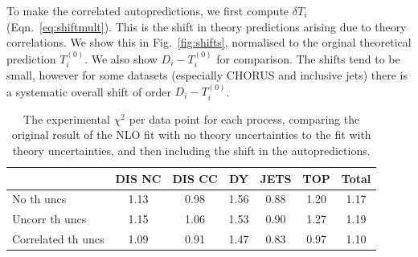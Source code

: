 To make the correlated autopredictions, we first compute $\delta T_i$ (Eqn.~\ref{eq:shiftmult}). This is the shift in theory predictions arising due to theory correlations. We show this in Fig.~\ref{fig:shifts}, normalised to the orginal theoretical prediction $T^{(0)}_i$. We also show $D_i-T_i^{(0)}$ for comparison. The shifts tend to be small, however for some datasets (especially CHORUS and inclusive jets) there is a systematic overall shift of order $D_i-T_i^{(0)}$.

\begin{table}[b!]
\centering
\begin{tabular}{|l||ccccc|c|}
\hline
                   & \textbf{DIS NC} & \textbf{DIS CC} & \textbf{DY} & \textbf{JETS} & \textbf{TOP} & \textbf{Total} \\
                   \hline
No th uncs         & 1.13            & 0.98            & 1.56        & 0.88         & 1.20         & 1.17           \\
Uncorr th uncs     & 1.15            & 1.06            & 1.53        & 0.90         & 1.27         & 1.19           \\
Correlated th uncs & 1.09            & 0.91           & 1.47        & 0.83         & 0.97        & 1.10    \\
\hline
\end{tabular}
\vspace{1cm}
\caption{The experimental $\chi^2$ per data point for each process, comparing the original result of the NLO fit with no theory uncertainties to the fit with theory uncertainties, and then including the shift in the autopredictions.}
  \label{tab:chisq}
\end{table}

